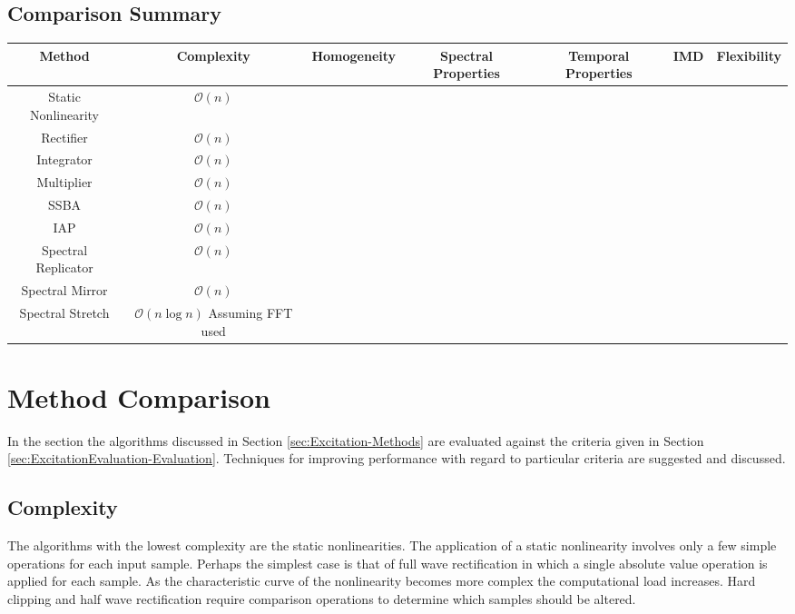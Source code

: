 \begin{landscape}
\section{Comparison Summary}
\label{sec:ExcitationEvaluation-Summary}

	\begin{tabular}{|c|c|c|c|c|c|c|}
		\hline
		\bf{Method} & \bf{Complexity} & \bf{Homogeneity} & \bf{Spectral Properties} & \bf{Temporal Properties} &
		\bf{IMD} & \bf{Flexibility} \\ %
		\hline
		Static Nonlinearity & $\mathcal{O}(n)$ & & & & & \\
		\hline
		Rectifier & $\mathcal{O}(n)$ & & & & & \\
		\hline
		Integrator & $\mathcal{O}(n)$ & & & & & \\
		\hline
		Multiplier & $\mathcal{O}(n)$ & & & & & \\
		\hline
		SSBA & $\mathcal{O}(n)$ & & & & & \\
		\hline
		IAP & $\mathcal{O}(n)$ & & & & & \\
		\hline
		Spectral Replicator & $\mathcal{O}(n)$ & & & & & \\
		\hline
		Spectral Mirror & $\mathcal{O}(n)$ & & & & & \\
		\hline
		Spectral Stretch & $\mathcal{O}(n\log{n})$ Assuming FFT used & & & & & \\
		\hline
	\end{tabular}

\end{landscape}

\section{Method Comparison}
\label{sec:ExcitationEvaluation-Comparison}
	In the section the algorithms discussed in Section \ref{sec:Excitation-Methods} are evaluated against the criteria
	given in Section \ref{sec:ExcitationEvaluation-Evaluation}. Techniques for improving performance with regard to
	particular criteria are suggested and discussed. 

	\subsection{Complexity}
	\label{sec:ExcitationEvaluation-Comparison-Complexity}
		The algorithms with the lowest complexity are the static nonlinearities. The application of a static
		nonlinearity involves only a few simple operations for each input sample. Perhaps the simplest case is that
		of full wave rectification in which a single absolute value operation is applied for each sample. As the
		characteristic curve of the nonlinearity becomes more complex the computational load increases. Hard
		clipping and half wave rectification require comparison operations to determine which samples should be
		altered. 


